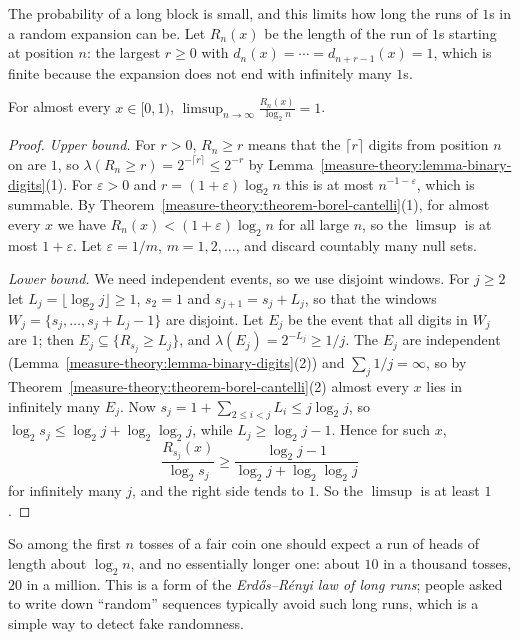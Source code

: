 The probability of a long block is small, and this limits how long the runs of $1$s in a random expansion can be. Let $R_n(x)$ be the length of the run of $1$s starting at position $n$: the largest $r \geq 0$ with
$d_n(x) = \cdots = d_{n+r-1}(x) = 1$, which is finite because the expansion does not end with infinitely many $1$s.

\begin{proposition}\label{measure-theory:proposition-long-runs}
For almost every $x \in [0, 1)$, $\displaystyle\limsup_{n \to \infty}\frac{R_n(x)}{\log_2n} = 1$.
\end{proposition}

\begin{proof}
\emph{Upper bound.} For $r > 0$, $R_n \geq r$ means that the $\lceil r\rceil$ digits from position $n$ on are $1$, so $\lambda(R_n \geq r) = 2^{-\lceil r\rceil} \leq 2^{-r}$ by
Lemma~\ref{measure-theory:lemma-binary-digits}(1). For $\varepsilon > 0$ and $r = (1 + \varepsilon)\log_2n$ this is at most $n^{-1-\varepsilon}$, which is summable. By
Theorem~\ref{measure-theory:theorem-borel-cantelli}(1), for almost every $x$ we have $R_n(x) < (1 + \varepsilon)\log_2n$ for all large $n$, so the $\limsup$ is at most $1 + \varepsilon$. Let
$\varepsilon = 1/m$, $m = 1, 2, \ldots$, and discard countably many null sets.

\emph{Lower bound.} We need independent events, so we use disjoint windows. For $j \geq 2$ let $L_j = \lfloor\log_2j\rfloor \geq 1$, $s_2 = 1$ and $s_{j+1} = s_j + L_j$, so that the windows
$W_j = \{s_j, \ldots, s_j + L_j - 1\}$ are disjoint. Let $E_j$ be the event that all digits in $W_j$ are $1$; then $E_j \subseteq \{R_{s_j} \geq L_j\}$, and $\lambda(E_j) = 2^{-L_j} \geq 1/j$. The $E_j$ are
independent (Lemma~\ref{measure-theory:lemma-binary-digits}(2)) and $\sum_j1/j = \infty$, so by Theorem~\ref{measure-theory:theorem-borel-cantelli}(2) almost every $x$ lies in infinitely many $E_j$. Now
$s_j = 1 + \sum_{2 \leq i < j}L_i \leq j\log_2j$, so $\log_2s_j \leq \log_2j + \log_2\log_2j$, while $L_j \geq \log_2j - 1$. Hence for such $x$,
\[
\frac{R_{s_j}(x)}{\log_2s_j} \geq \frac{\log_2j - 1}{\log_2j + \log_2\log_2j}
\]
for infinitely many $j$, and the right side tends to $1$. So the $\limsup$ is at least $1$.
\end{proof}

So among the first $n$ tosses of a fair coin one should expect a run of heads of length about $\log_2n$, and no essentially longer one: about $10$ in a thousand tosses, $20$ in a million. This is a form
of the \emph{Erd\H{o}s--R\'enyi law of long runs}; people asked to write down ``random'' sequences typically avoid such long runs, which is a simple way to detect fake randomness.

